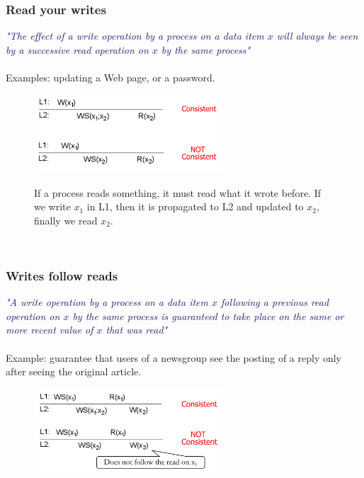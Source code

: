 \documentclass[10pt,a4paper]{article}
\newcommand{\mydefinition}[1]{\textcolor{MidnightBlue}{\textit{"#1"}\\ \\}}
\begin{document}
\subsubsection{Read your writes}
\mydefinition{The effect of a write operation by a process on a data item $x$ will always be seen by a successive read operation on $x$ by the same process}
Examples: updating a Web page, or a password.
\begin{figure}[h!]
 \hfill \includegraphics[width=200pt]{images/read-your-writes.png}\hspace*{\fill}
  \label{fig:read-your-writes}
  \caption{If a process reads something, it must read what it wrote before. If we write $x_1$ in L1, then it is propagated to L2 and updated to $x_2$, finally we read $x_2$.}
\end{figure} \\
\subsubsection{Writes follow reads} 
\mydefinition{A write operation by a process on a data item $x$ following a previous read operation on $x$ by the same process is guaranteed to take place on the same or more recent value of $x$ that was read}
Example: guarantee that users of a newsgroup see the posting of a reply only after seeing the original article.
\begin{figure}[h!]
 \hfill \includegraphics[width=200pt]{images/writes-follow-reads.png}\hspace*{\fill}
  \label{fig:writes-follow-reads}
\end{figure} \\
\end{document}
